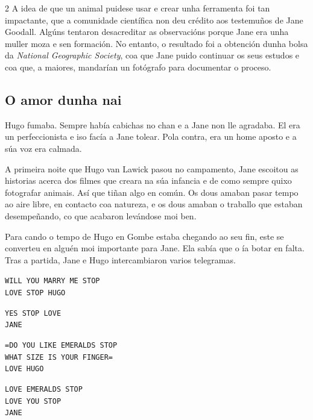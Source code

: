 \begin{multicols}{2}
A idea de que un animal puidese usar e crear unha ferramenta foi tan
impactante, que a comunidade científica non deu crédito aos testemuños de Jane
Goodall. Algúns tentaron desacreditar as observacións porque Jane era unha
muller moza e sen formación. No entanto, o resultado foi a obtención dunha
bolsa da \textit{National Geographic Society}, coa que Jane puido continuar os
seus estudos e coa que, a maiores, mandarían un fotógrafo para documentar o
proceso.

\subsection*{O amor dunha nai}

Hugo fumaba. Sempre había cabichas no chan e a Jane non lle agradaba. El era un
perfeccionista e iso facía a Jane tolear. Pola contra, era un home aposto e a
súa voz era calmada.

A primeira noite que Hugo van Lawick pasou no campamento, Jane escoitou as
historias acerca dos filmes que creara na súa infancia e de como sempre quixo
fotografar animais. Así que tiñan algo en común. Os dous amaban pasar tempo ao
aire libre, en contacto coa natureza, e os dous amaban o traballo que estaban
desempeñando, co que acabaron levándose moi ben.

Para cando o tempo de Hugo en Gombe estaba chegando ao seu fin, este se
converteu en alguén moi importante para Jane. Ela sabía que o ía botar en
falta. Tras a partida, Jane e Hugo intercambiaron varios telegramas.

\begin{center}
    \begin{minipage}{1\linewidth}
        \raggedright
        \texttt{WILL YOU MARRY ME STOP\\ LOVE STOP HUGO}
    \end{minipage}
    \begin{minipage}{1\linewidth}
        \raggedleft
        \texttt{YES STOP LOVE\\ JANE}
    \end{minipage}
    \begin{minipage}{1\linewidth}
        \raggedright
        \texttt{=DO YOU LIKE EMERALDS STOP\\ WHAT SIZE IS YOUR FINGER=\\ LOVE HUGO}
    \end{minipage}
    \begin{minipage}{1\linewidth}
        \raggedleft
        \texttt{LOVE EMERALDS STOP\\ LOVE YOU STOP\\ JANE}
    \end{minipage}
\end{center}


\end{multicols}
